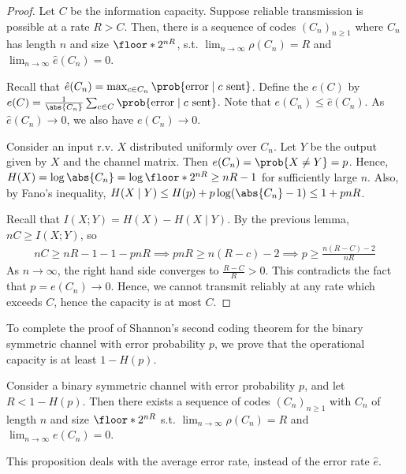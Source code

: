 \begin{proof}
    Let $C$ be the information capacity.
    Suppose reliable transmission is possible at a rate $R > C$.
    Then, there is a sequence of codes $(C_n)_{n \geq 1}$ where $C_n$ has length $n$ and size $\floor*{2^{nR}}$, s.t. $\lim_{n \to \infty} \rho(C_n) = R$ and $\lim_{n \to \infty} \hat e(C_n) = 0$.

    Recall that $\hat e(C_n) = \max_{c \in C_n} \prob{\text{error} \mid c \text{ sent}}$.
    Define the  $e(C)$ by $e(C) = \frac{1}{\abs{C_n}} \sum_{c \in C} \prob{\text{error} \mid c \text{ sent}}$.
    Note that $e(C_n) \leq \hat e(C_n)$.
    As $\hat e(C_n) \to 0$, we also have $e(C_n) \to 0$.

    Consider an input r.v. $X$ distributed uniformly over $C_n$.
    Let $Y$ be the output given by $X$ and the channel matrix.
    Then $e(C_n) = \prob{X \neq Y} = p$.
    Hence, $H(X) = \log \abs{C_n} = \log \floor*{2^{nR}} \geq nR - 1$ for sufficiently large $n$.
    Also, by Fano's inequality, $H(X \mid Y) \leq H(p) + p \log(\abs{C_n} - 1) \leq 1 + pnR$.

    Recall that $I(X;Y) = H(X) - H(X \mid Y)$.
    By the previous lemma, $nC \geq I(X;Y)$, so
    \begin{align*}
        nC \geq nR - 1 - 1 - pnR \implies pnR \geq n(R - c) - 2 \implies p \geq \frac{n(R - C) - 2}{nR}
    \end{align*}
    As $n \to \infty$, the right hand side converges to $\frac{R - C}{R} > 0$.
    This contradicts the fact that $p = e(C_n) \to 0$.
    Hence, we cannot transmit reliably at any rate which exceeds $C$, hence the capacity is at most $C$.
\end{proof}
To complete the proof of Shannon's second coding theorem for the binary symmetric channel with error probability $p$, we prove that the operational capacity is at least $1 - H(p)$.
\begin{proposition}
    Consider a binary symmetric channel with error probability $p$, and let $R < 1 - H(p)$.
    Then there exists a sequence of codes $(C_n)_{n \geq 1}$ with $C_n$ of length $n$ and size $\floor*{2^{nR}}$ s.t. $\lim_{n \to \infty} \rho(C_n) = R$ and $\lim_{n \to \infty} e(C_n) = 0$.
\end{proposition}
\begin{remark}
    This proposition deals with the average error rate, instead of the error rate $\hat e$.
\end{remark}
